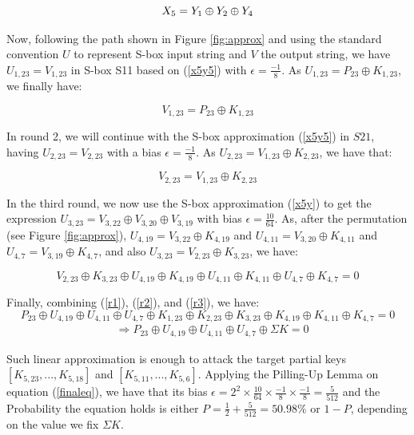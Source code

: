\documentclass[11pt]{article}
\begin{document}
\begin{equation}
 X_5 = Y_1 \oplus Y_2 \oplus Y_4\\
\label{x5y}
\end{equation}

Now, following the path shown in Figure \ref{fig:approx} and using the standard convention $U$ to represent S-box input string and $V$ the output string, we have $U_{1,23} = V_{1,23}$ in S-box S11 based on (\ref{x5y5}) with $\epsilon = \frac{-1}{8}$. As $U_{1,23} = P_{23} \oplus K_{1,23}$, we finally have:

\begin{equation}
V_{1,23} = P_{23} \oplus K_{1,23}
\label{r1}
\end{equation}

In round 2, we will continue with the S-box approximation (\ref{x5y5}) in $S21$, having $U_{2,23} = V_{2,23}$ with a bias $\epsilon = \frac{-1}{8}$. As $U_{2,23} = V_{1,23} \oplus K_{2,23}$, we have that:

\begin{equation}
V_{2,23} = V_{1,23} \oplus K_{2,23}
\label{r2}
\end{equation}


In the third round, we now use the S-box approximation (\ref{x5y}) to get the expression $U_{3,23} = V_{3,22}\oplus V_{3,20} \oplus V_{3,19}$ with bias $\epsilon = \frac{10}{64}$. As, after the permutation (see Figure \ref{fig:approx}), $U_{4,19} = V_{3,22} \oplus K_{4,19}$ and $U_{4,11} = V_{3,20} \oplus K_{4,11}$ and $U_{4,7} = V_{3,19} \oplus K_{4,7}$, and also $U_{3,23} = V_{2,23} \oplus K_{3,23}$, we have:

\begin{equation}
V_{2,23} \oplus K_{3,23} \oplus U_{4,19} \oplus K_{4,19} \oplus U_{4,11} \oplus K_{4,11} \oplus U_{4,7} \oplus K_{4,7} = 0
\label{r3}
\end{equation}

Finally, combining (\ref{r1}), (\ref{r2}), and (\ref{r3}), we have:
\begin{equation}
P_{23} \oplus U_{4,19} \oplus U_{4,11} \oplus U_{4,7} \oplus K_{1,23} \oplus K_{2,23} \oplus K_{3,23}  \oplus K_{4,19} \oplus K_{4,11} \oplus K_{4,7} = 0 
\label{finaleq}
\end{equation}
\begin{align*}
& \Longrightarrow P_{23} \oplus U_{4,19} \oplus U_{4,11} \oplus U_{4,7} \oplus \Sigma K = 0
\end{align*}

Such linear approximation is enough to attack the target partial keys $[K_{5,23},...,K_{5,18}]$ and $[K_{5,11},...,K_{5,6}]$. Applying the Pilling-Up Lemma on equation (\ref{finaleq}), we have that its bias $\epsilon = 2^2 \times \frac{10}{64} \times \frac{-1}{8} \times \frac{-1}{8} = \frac{5}{512}$ and the Probability the equation holds is either $P = \frac{1}{2} + \frac{5}{512} = 50.98\%$ or $1-P$, depending on the value we fix $\Sigma K$.
\end{document}
